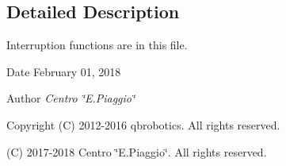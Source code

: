 \subsection{Detailed Description}
Interruption functions are in this file. 

\begin{DoxyDate}{Date}
February 01, 2018 
\end{DoxyDate}
\begin{DoxyAuthor}{Author}
{\itshape Centro \char`\"{}\+E.\+Piaggio\char`\"{}} 
\end{DoxyAuthor}
\begin{DoxyCopyright}{Copyright}
(C) 2012-\/2016 qbrobotics. All rights reserved. 

(C) 2017-\/2018 Centro \char`\"{}\+E.\+Piaggio\char`\"{}. All rights reserved. 
\end{DoxyCopyright}

